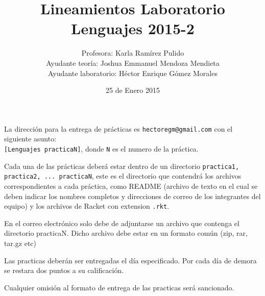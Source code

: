 \documentclass{article}
\author{Profesora: Karla Ramírez Pulido\\
  Ayudante teoría: Joshua Emmanuel Mendoza Mendieta\\
  Ayudante laboratorio: Héctor Enrique Gómez Morales}
\title{Lineamientos Laboratorio Lenguajes 2015-2}
\date{25 de Enero 2015}
\begin{document}
\maketitle

La dirección para la entrega de prácticas es
\texttt{hectoregm@gmail.com} con el siguiente asunto: \\
\texttt{[Lenguajes practicaN]}, donde \texttt{N} es el numero de la práctica.

Cada una de las prácticas deberá estar dentro de un
directorio \texttt{practica1, practica2, ... practicaN}, este es el
directorio que contendrá los archivos correspondientes a cada
práctica, como README (archivo de texto en el cual se deben indicar
los nombres completos y direcciones de correo de los integrantes del
equipo) y los archivos de Racket con extension \texttt{.rkt}.

En el correo electrónico solo debe de adjuntarse un archivo que
contenga el directorio practicaN. Dicho archivo debe 
estar en un formato común (zip, rar, tar.gz etc)

Las practicas deberán ser entregadas el día especificado. Por cada día
de demora se restara dos puntos a su calificación.

Cualquier omisión al formato de entrega de las practicas será
sancionado.
\end{document}
